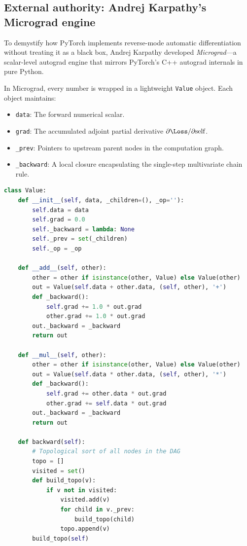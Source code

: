 \documentclass[../labs.tex]{subfiles}
\begin{document}
\subsection{External authority: Andrej Karpathy's Micrograd engine}
To demystify how PyTorch implements reverse-mode automatic differentiation without treating it as a black box, Andrej Karpathy developed \emph{Micrograd}---a scalar-level autograd engine that mirrors PyTorch's C++ autograd internals in pure Python.

\begin{deepdive}
In Micrograd, every number is wrapped in a lightweight \texttt{Value} object. Each object maintains:
\begin{itemize}
    \item \texttt{data}: The forward numerical scalar.
    \item \texttt{grad}: The accumulated adjoint partial derivative $\partial \Loss / \partial \text{self}$.
    \item \texttt{\_prev}: Pointers to upstream parent nodes in the computation graph.
    \item \texttt{\_backward}: A local closure encapsulating the single-step multivariate chain rule.
\end{itemize}

\begin{lstlisting}[language=Python, caption={Core structure of Andrej Karpathy's scalar autograd engine.}, label={lst:karpathy_micrograd}]
class Value:
    def __init__(self, data, _children=(), _op=''):
        self.data = data
        self.grad = 0.0
        self._backward = lambda: None
        self._prev = set(_children)
        self._op = _op

    def __add__(self, other):
        other = other if isinstance(other, Value) else Value(other)
        out = Value(self.data + other.data, (self, other), '+')
        def _backward():
            self.grad += 1.0 * out.grad
            other.grad += 1.0 * out.grad
        out._backward = _backward
        return out

    def __mul__(self, other):
        other = other if isinstance(other, Value) else Value(other)
        out = Value(self.data * other.data, (self, other), '*')
        def _backward():
            self.grad += other.data * out.grad
            other.grad += self.data * out.grad
        out._backward = _backward
        return out

    def backward(self):
        # Topological sort of all nodes in the DAG
        topo = []
        visited = set()
        def build_topo(v):
            if v not in visited:
                visited.add(v)
                for child in v._prev:
                    build_topo(child)
                topo.append(v)
        build_topo(self)


\end{lstlisting}
\end{deepdive}
\end{document}
